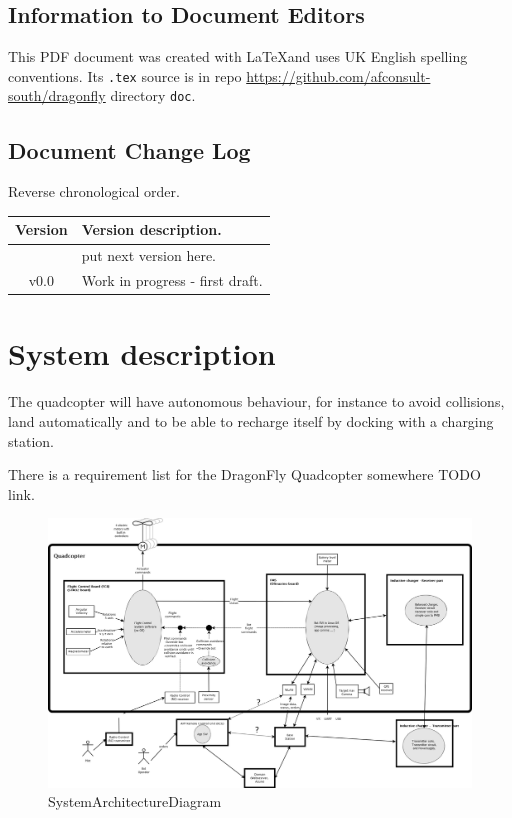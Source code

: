 \documentclass[a4paper]{article}
\begin{document}
\subsection{Information to Document Editors}
\label{sec:editors}
This PDF document was created with \LaTeX and uses UK English spelling conventions. Its \texttt{.tex} source is in repo \url{https://github.com/afconsult-south/dragonfly} directory \texttt{doc}.

\subsection{Document Change Log}
Reverse chronological order.

\begin{center}
\begin{tabular}{ c | l }
  \hline
  Version & Version description. \\ \hline
   & put next version here. \\ \hline
  v0.0 & Work in progress - first draft. \\ \hline
\end{tabular}
\end{center}

\newpage

\section{System description}
The quadcopter will have autonomous behaviour, for instance to avoid collisions, land automatically and to be able to recharge itself by docking with a charging station.

There is a requirement list for the DragonFly Quadcopter somewhere TODO link.

\begin{figure}[!h]
    \centering
    \includegraphics[width=\textwidth]{images/SystemArchitectureDiagram_DF.png}
    \caption{SystemArchitectureDiagram}
    \label{fig:sysarchdiag}
\end{figure}
\end{document}
